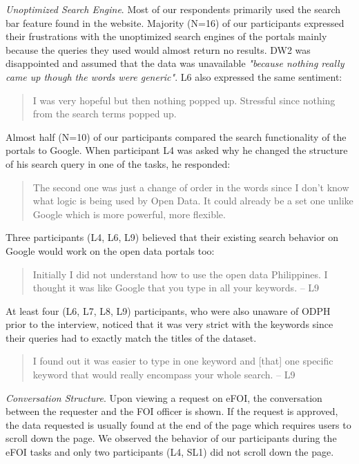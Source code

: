 \documentclass{sigchi}
\begin{document}
\textit{Unoptimized Search Engine}. Most of our respondents primarily used the search bar feature found in the website. Majority (N=16) of our participants expressed their frustrations with the unoptimized search engines of the portals mainly because the queries they used would almost return no results. DW2 was disappointed and assumed that the data was unavailable \textit{"because nothing really came up though the words were generic"}. L6 also expressed the same sentiment:
\begin{quote}
I was very hopeful but then nothing popped up. Stressful since nothing from the search terms popped up.
\end{quote}

Almost half (N=10) of our participants compared the search functionality of the portals to Google. When participant L4 was asked why he changed the structure of his search query in one of the tasks, he responded:
\begin{quote}
The second one was just a change of order in the words since I don't know what logic is being used by Open Data. It could already be a set one unlike Google which is more powerful, more flexible.
\end{quote}

Three participants (L4, L6, L9) believed that their existing search behavior on Google would work on the open data portals too:
\begin{quote}
Initially I did not understand how to use the open data Philippines. I thought it was like Google that you type in all your keywords. -- L9
\end{quote}

At least four (L6, L7, L8, L9) participants, who were also unaware of ODPH prior to the interview, noticed that it was very strict with the keywords since their queries had to exactly match the titles of the dataset. 
\begin{quote}
I found out it was easier to type in one keyword and [that] one specific keyword that would really encompass your whole search. -- L9
\end{quote}

\textit{Conversation Structure}. Upon viewing a request on eFOI, the conversation between the requester and the FOI officer is shown. If the request is approved, the data requested is usually found at the end of the page which requires users to scroll down the page. We observed the behavior of our participants during the eFOI tasks and only two participants (L4, SL1) did not scroll down the page.
\end{document}
